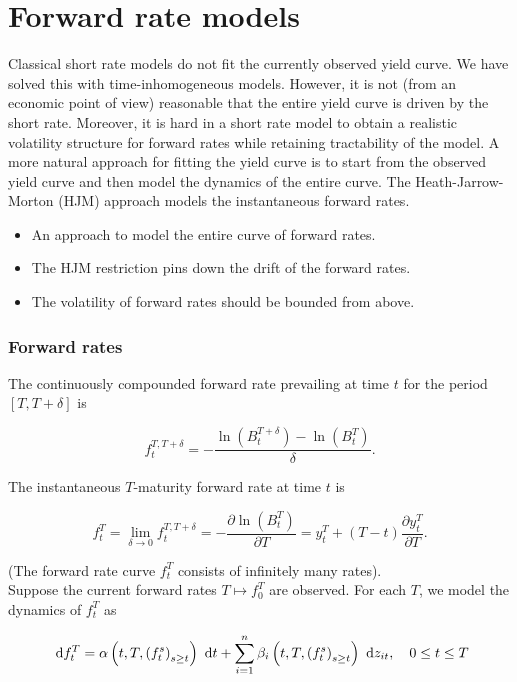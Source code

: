 \chapter{Forward rate models}
Classical short rate models do not fit the currently observed yield curve. We have solved this with time-inhomogeneous models. However, it is not (from an economic point of view) reasonable that the entire yield curve is driven by the short rate. Moreover, it is hard in a short rate model to obtain a realistic volatility structure for forward rates while retaining tractability of the model. A more natural approach for fitting the yield curve is to start from the observed yield curve and then model the dynamics of the entire curve. The Heath-Jarrow-Morton (HJM) approach models the instantaneous forward rates.

\begin{itemize}
  \item An approach to model the entire curve of forward rates.
  \item The HJM restriction pins down the drift of the forward rates.
  \item The volatility of forward rates should be bounded from above.
\end{itemize}

\subsection{Forward rates}
The continuously compounded forward rate prevailing at time $t$ for the period $[T, T+\delta]$ is

$$
f_{t}^{T, T+\delta}=-\frac{\ln \left(B_{t}^{T+\delta}\right)-\ln \left(B_{t}^{T}\right)}{\delta} .
$$

The instantaneous $T$-maturity forward rate at time $t$ is

$$
f_{t}^{T}=\lim _{\delta \rightarrow 0} f_{t}^{T, T+\delta}=-\frac{\partial \ln \left(B_{t}^{T}\right)}{\partial T}=y_{t}^{T}+(T-t) \frac{\partial y_{t}^{T}}{\partial T} .
$$

(The forward rate curve $f_{t}^{T}$ consists of infinitely many rates).\\
Suppose the current forward rates $T \mapsto f_{0}^{T}$ are observed. For each $T$, we model the dynamics of $f_{t}^{T}$ as

$$
\text{ d}  f_{t}^{T}=\alpha\left(t, T,\left(f_{t}^{s}\right)_{s \geq t}\right) \text{ d}  t+\sum_{i=1}^{n} \beta_{i}\left(t, T,\left(f_{t}^{s}\right)_{s \geq t}\right) \text{ d}  z_{i t}, \quad 0 \leq t \leq T
$$

